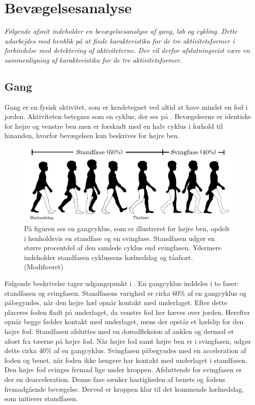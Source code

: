 \section{Bevægelsesanalyse} \label{bevaegelse}
\textit{Følgende afsnit indeholder en bevægelsesanalyse af gang, løb og cykling. Dette udarbejdes med henblik på at finde karakteristika for de tre aktivitetsformer i forbindelse med detektering af aktiviteterne. Der vil derfor afslutningsvist være en sammenligning af karakteristika for de tre aktivitetsformer.}

\subsection{Gang}
Gang er en fysisk aktivitet, som er kendetegnet ved altid at have mindst en fod i jorden. Aktiviteten betegnes som en cyklus, der ses på . Bevægelserne er identiske for højre og venstre ben men er forskudt med en halv cyklus i forhold til hinanden, hvorfor bevægelsen kun beskrives for højre ben. \citep{VaughanDavisOConnor1992,Whittle1990} 
\begin{figure}[H]
	\centering
	\includegraphics[scale=0.7]{figures/bProblemloesning/gang_cyklus.png}
	\caption{På figuren ses en gangcyklus, som er illustreret for højre ben, opdelt i henholdsvis en standfase og en svingfase. Standfasen udgør en større procentdel af den samlede cyklus end svingfasen. Ydermere indeholder standfasen cyklussens hælnedslag og tåafsæt. \citep{VaughanDavisOConnor1992} (Modificeret)}
	\label{fig:gang_cyklus}
\end{figure}\vspace{-0.25cm}
Følgende beskrivelse tager udgangspunkt i . En gangcyklus inddeles i to faser: standfasen og svingfasen. Standfasens varighed er cirka 60\% af en gangcyklus og påbegyndes, når den højre hæl opnår kontakt med underlaget. Efter dette placeres foden fladt på underlaget, da venstre fod her hæves over jorden. Herefter opnår begge fødder kontakt med underlaget, mens der opstår et hælslip for den højre fod. Standfasen afsluttes med en dorsalfleksion af anklen og dermed et afsæt fra tæerne på højre fod. \citep{VaughanDavisOConnor1992,Whittle1990}  \newline 
Når højre fod samt højre ben er i svingfasen, udgør dette cirka 40\% af en gangcyklus. Svingfasen påbegyndes med en acceleration af foden og benet, når foden ikke længere har kontakt med underlaget i standfasen. Den højre fod svinges fremad lige under kroppen. Afsluttende for svingfasen er der en deacceleration. Denne fase sænker hastigheden af benets og fodens fremadgående bevægelse. Derved er kroppen klar til det kommende hælnedslag, som initierer standfasen. \citep{VaughanDavisOConnor1992,Whittle1990}

